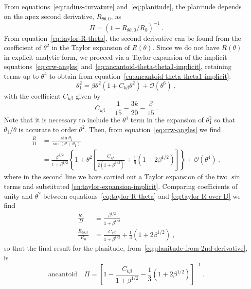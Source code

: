 \documentclass[useAMS, usenatbib, a4paper]{mnras}
\begin{document}
From equations~\eqref{eq:radius-curvature} and~\eqref{eq:planitude},
the planitude depends on the apex second derivative,
\(R_{\theta\theta,0}\), as
\begin{equation}
  \label{eq:planitude-from-2nd-derivative}
  \Pi = \left(  1 - R_{\theta\theta,0} / R_0\right)^{-1} \ .
\end{equation}
From equation~\eqref{eq:taylor-R-theta}, the second derivative can be
found from the coefficient of \(\theta^2\) in the Taylor expansion
of \(R(\theta)\).  Since we do not have \(R(\theta)\) in explicit analytic form,
we proceed via a Taylor expansion of the implicit
equations~\eqref{eq:crw-angles}
and~\eqref{eq:ancantoid-theta-theta1-implicit}, retaining terms up to
\(\theta^4\) to obtain from
equation~\eqref{eq:ancantoid-theta-theta1-implicit}:
\begin{equation}
  \label{eq:taylor-expansion-implicit}
  \theta_1^2 = \beta \theta^2 \left( 1 + C_{k\beta} \theta^2\right) + \mathcal{O}(\theta^6)\ , 
\end{equation}
with the coefficient \(C_{k\beta}\) given by
\begin{equation}
  \label{eq:C-k-beta}
  C_{k\beta} = \frac{1}{15} - \frac{3k}{20} - \frac{\beta}{15}  \ .
\end{equation}
Note that it is necessary to include the \(\theta^4\) term in the expansion
of \(\theta_1^2\) so that \(\theta_1/\theta\) is accurate to order
\(\theta^2\).  Then, from equation~\eqref{eq:crw-angles} we find
\begin{align}
  \label{eq:taylor-R-over-D}
  \frac{R}{D} & = \frac{\sin \theta_1} {\sin (\theta + \theta_1)} \nonumber \\
              & = \frac{\beta^{1/2}}{1+\beta^{1/2}}
                \left\lbrace 1 + \theta^2
                \left[ \frac{C_{k\beta}} {2 \left(1+\beta^{1/2}\right)}
                + \frac{1}{6} \left(1+2\beta^{1/2} \right)
                \right]
                \right\rbrace + \mathcal{O}(\theta^4) \ ,
\end{align}
where in the second line we have carried out a Taylor expansion of the
two \(\sin\) terms and substituted
\eqref{eq:taylor-expansion-implicit}.  Comparing coefficients of unity
and \(\theta^2\) between equations~\eqref{eq:taylor-R-theta} and
\eqref{eq:taylor-R-over-D} we find
\begin{align}
  \label{eq:again-R0-over-D}
  \frac{R_0} {D} &= \frac{\beta^{1/2}}{1+\beta^{1/2}} \\
  \label{eq:final-second-derivative}
  \frac{R_{\theta\theta,0}} {R_0} &= \frac{C_{k\beta}}{1+\beta^{1/2}}+\frac{1}{3}\left(1+2\beta^{1/2}\right) \ ,
\end{align}
so that the final result for the planitude, from~\eqref{eq:planitude-from-2nd-derivative}, is
\begin{equation}
  \label{eq:final-planitude}
  \text{ancantoid} \quad
  \Pi = \left[ {1 - \frac{C_{k\beta}}{1+\beta^{1/2}} - \frac{1}{3}\left(1+2\beta^{1/2}\right)}
  \right]^{-1} \ .
\end{equation}
\end{document}
